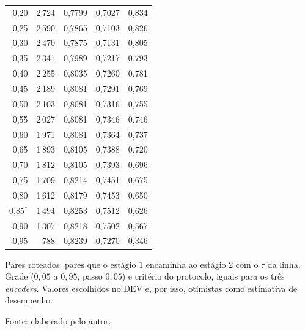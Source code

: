 \begin{longtable}{@{\extracolsep{\fill}}rrrrr}
0{,}20 & 2\,724 & 0{,}7799 & 0{,}7027 & 0{,}834 \\
0{,}25 & 2\,590 & 0{,}7865 & 0{,}7103 & 0{,}826 \\
0{,}30 & 2\,470 & 0{,}7875 & 0{,}7131 & 0{,}805 \\
0{,}35 & 2\,341 & 0{,}7989 & 0{,}7217 & 0{,}793 \\
0{,}40 & 2\,255 & 0{,}8035 & 0{,}7260 & 0{,}781 \\
0{,}45 & 2\,189 & 0{,}8081 & 0{,}7291 & 0{,}769 \\
0{,}50 & 2\,103 & 0{,}8081 & 0{,}7316 & 0{,}755 \\
0{,}55 & 2\,027 & 0{,}8081 & 0{,}7346 & 0{,}746 \\
0{,}60 & 1\,971 & 0{,}8081 & 0{,}7364 & 0{,}737 \\
0{,}65 & 1\,893 & 0{,}8105 & 0{,}7388 & 0{,}720 \\
0{,}70 & 1\,812 & 0{,}8105 & 0{,}7393 & 0{,}696 \\
0{,}75 & 1\,709 & 0{,}8214 & 0{,}7451 & 0{,}675 \\
0{,}80 & 1\,612 & 0{,}8179 & 0{,}7453 & 0{,}650 \\
0{,}85$^{\ast}$ & 1\,494 & 0{,}8253 & 0{,}7512 & 0{,}626 \\
0{,}90 & 1\,307 & 0{,}8218 & 0{,}7502 & 0{,}567 \\
0{,}95 & 788 & 0{,}8239 & 0{,}7270 & 0{,}346 \\
\end{longtable}
\vspace{-\baselineskip}
\nopagebreak\noindent\begin{minipage}{\linewidth}
{\footnotesize Pares roteados: pares que o estágio 1 encaminha ao estágio 2 com o $\tau$ da linha. Grade ($0{,}05$ a $0{,}95$, passo $0{,}05$) e critério do protocolo, iguais para os três \emph{encoders}. Valores escolhidos no DEV e, por isso, otimistas como estimativa de desempenho.\par}\vspace{4pt}
{\footnotesize Fonte: elaborado pelo autor.}
\end{minipage}\par
\endgroup
